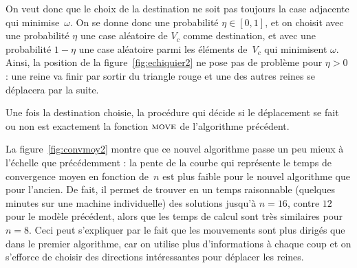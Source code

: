 \documentclass[11pt, openany, a4paper]{article}
\newcommand{\M}{\textsc{move}}
\begin{document}

On veut donc que le choix de la destination ne soit pas toujours la case adjacente qui minimise~$\omega$. On se donne donc une probabilité $\eta \in [0,1]$, et on choisit avec une probabilité $\eta$ une case aléatoire de $V_c$ comme destination, et avec une probabilité $1 - \eta$ une case aléatoire parmi les éléments de~$V_c$ qui minimisent $\omega$. Ainsi, la position de la figure~\ref{fig:echiquier2} ne pose pas de problème pour $\eta > 0$ : une reine va finir par sortir du triangle rouge et une des autres reines se déplacera par la suite.

Une fois la destination choisie, la procédure qui décide si le déplacement se fait ou non est exactement la fonction $\M$ de l'algorithme précédent.



        
    

La figure~\ref{fig:convmoy2} montre que ce nouvel algorithme passe un peu mieux à l'échelle que précédemment : la pente de la courbe qui représente le temps de convergence moyen en fonction de~$n$ est plus faible pour le nouvel algorithme que pour l'ancien. De fait, il permet de trouver en un temps raisonnable (quelques minutes sur une machine individuelle) des solutions jusqu'à $n=16$, contre $12$ pour le modèle précédent, alors que les temps de calcul sont très similaires pour $n=8$. Ceci peut s'expliquer par le fait que les mouvements sont plus dirigés que dans le premier algorithme, car on utilise plus d'informations à chaque coup et on s'efforce de choisir des directions intéressantes pour déplacer les reines.
\end{document}

